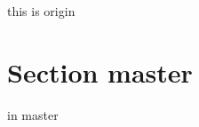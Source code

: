 \documentclass{article}
\begin{document}
    this is origin

    \section{Section master}
    in master
\end{document}
